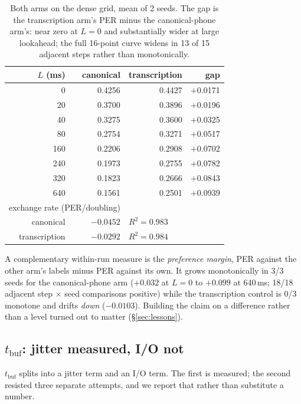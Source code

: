 \documentclass[journal]{IEEEtran}
\newcommand{\tbuf}{\ensuremath{t_{\mathrm{buf}}}}
\begin{document}
\begin{table}[t]
\centering\small
\caption{Both arms on the dense grid, mean of 2 seeds. The gap is the
transcription arm's PER minus the canonical-phone arm's: near zero at $L{=}0$ and
substantially wider at large lookahead; the full
16-point curve widens in 13 of 15 adjacent steps rather than monotonically.}
\label{tab:h3dense}
\begin{tabular}{rrrr}
\toprule
$L$ (ms) & canonical & transcription & gap \\
\midrule
0   & 0.4256 & 0.4427 & $+$0.0171 \\
20  & 0.3700 & 0.3896 & $+$0.0196 \\
40  & 0.3275 & 0.3600 & $+$0.0325 \\
80  & 0.2754 & 0.3271 & $+$0.0517 \\
160 & 0.2206 & 0.2908 & $+$0.0702 \\
240 & 0.1973 & 0.2755 & $+$0.0782 \\
320 & 0.1823 & 0.2666 & $+$0.0843 \\
640 & 0.1561 & 0.2501 & $+$0.0939 \\
\midrule
\multicolumn{2}{l}{exchange rate (PER/doubling)} & & \\
\multicolumn{1}{r}{canonical} & $-0.0452$ & \multicolumn{2}{l}{$R^2=0.983$} \\
\multicolumn{1}{r}{transcription} & $-0.0292$ & \multicolumn{2}{l}{$R^2=0.984$} \\
\bottomrule
\end{tabular}
\end{table}

A complementary within-run measure is the \emph{preference margin}, PER
against the other arm's labels minus PER against its own. It grows
monotonically in 3/3 seeds for the canonical-phone arm ($+0.032$ at $L{=}0$ to $+0.099$ at 640\,ms; 18/18
adjacent step $\times$ seed comparisons positive) while the transcription
control is 0/3 monotone and drifts \emph{down} ($-0.0103$). Building the claim
on a difference rather than a level turned out to matter
(\S\ref{sec:lessons}).

\subsection{\texorpdfstring{\tbuf{}}{t\_buf}: jitter measured, I/O not}

\tbuf{} splits into a jitter term and an I/O term. The first is measured; the
second resisted three separate attempts, and we report that rather than
substitute a number.
\end{document}
